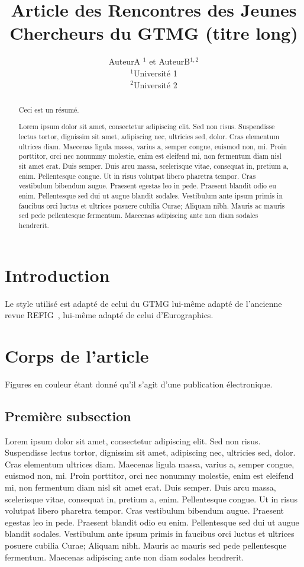 \documentclass{rgtmg} %
\title[Article R-GTMG]{Article des Rencontres des Jeunes Chercheurs du GTMG (titre long)}
\author[AuteurA et AuteurB]%
       {AuteurA $^1$
        et AuteurB$^{1,2}$
        \\
         $^1$Université 1\\
         $^2$Université 2
       }
\begin{document}
\maketitle

\begin{abstract}
   Ceci est un résumé.

   Lorem ipsum dolor sit amet, consectetur adipiscing elit. Sed non risus. Suspendisse lectus tortor, dignissim sit amet, adipiscing nec, ultricies sed, dolor. Cras elementum ultrices diam. Maecenas ligula massa, varius a, semper congue, euismod non, mi. Proin porttitor, orci nec nonummy molestie, enim est eleifend mi, non fermentum diam nisl sit amet erat. Duis semper. Duis arcu massa, scelerisque vitae, consequat in, pretium a, enim. Pellentesque congue. Ut in risus volutpat libero pharetra tempor. Cras vestibulum bibendum augue. Praesent egestas leo in pede. Praesent blandit odio eu enim. Pellentesque sed dui ut augue blandit sodales. Vestibulum ante ipsum primis in faucibus orci luctus et ultrices posuere cubilia Curae; Aliquam nibh. Mauris ac mauris sed pede pellentesque fermentum. Maecenas adipiscing ante non diam sodales hendrerit.

\end{abstract}
\section{Introduction}

Le style utilisé est adapté de celui du GTMG lui-même adapté de l'ancienne revue REFIG~\cite{REFIG1}, lui-même adapté de
celui d'Eurographics.

\section{Corps de l'article}

Figures en couleur étant donné qu'il s'agit d'une publication électronique.

\subsection{Première subsection}

Lorem ipsum dolor sit amet, consectetur adipiscing elit. Sed non risus. Suspendisse lectus tortor, dignissim sit amet, adipiscing nec, ultricies sed, dolor. Cras elementum ultrices diam. Maecenas ligula massa, varius a, semper congue, euismod non, mi. Proin porttitor, orci nec nonummy molestie, enim est eleifend mi, non fermentum diam nisl sit amet erat. Duis semper. Duis arcu massa, scelerisque vitae, consequat in, pretium a, enim. Pellentesque congue. Ut in risus volutpat libero pharetra tempor. Cras vestibulum bibendum augue. Praesent egestas leo in pede. Praesent blandit odio eu enim. Pellentesque sed dui ut augue blandit sodales. Vestibulum ante ipsum primis in faucibus orci luctus et ultrices posuere cubilia Curae; Aliquam nibh. Mauris ac mauris sed pede pellentesque fermentum. Maecenas adipiscing ante non diam sodales hendrerit.
\end{document}
